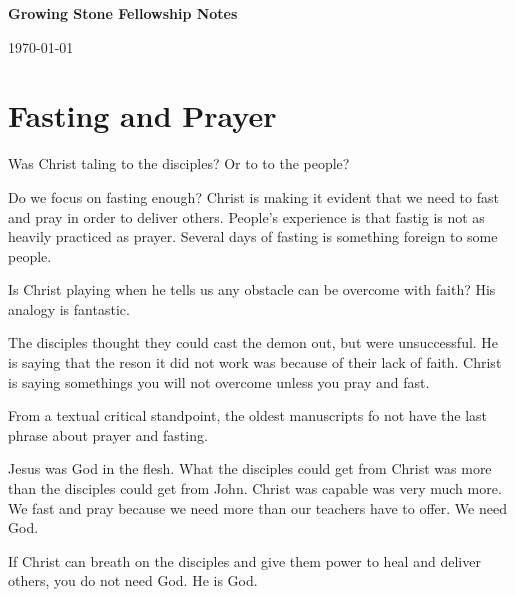 \documentclass[12pt]{article}
\begin{document}
	\textbf{Growing Stone Fellowship \hfill Notes}

	\hfill \today
	
	\section*{\normalsize Fasting and Prayer}

	\begin{quote}
		\BibleMatthewSeventeenSixteen{}
		\BibleMatthewSeventeenSeventeen{}
	\end{quote}
	
	Was Christ taling to the disciples? Or to to the people?

	\begin{quote}
		\BibleMatthewSeventeenNineteen{}
		\BibleMatthewSeventeenTwenty{}
		\BibleMatthewSeventeenTwentyOne{}
	\end{quote}

	Do we focus on fasting enough? Christ is making it evident that
	we need to fast and pray in order to deliver others. People's
	experience is that fastig is not as heavily practiced as prayer.
	Several days of fasting is something foreign to some people.

	Is Christ playing when he tells us any obstacle can be overcome
	with faith? His analogy is fantastic.

	The disciples thought they could cast the demon out, but were
	unsuccessful. He is saying that the reson it did not work was
	because of their lack of faith. Christ is saying somethings you
	will not overcome unless you pray and fast.

	From a textual critical standpoint, the oldest manuscripts
	fo not have the last phrase about prayer and fasting.

	\begin{quote}
		\BibleMarkTwoEighteen{}
		\BibleMarkTwoNineteen{}
	\end{quote}

	Jesus was God in the flesh. What the disciples could get from
	Christ was more than the disciples could get from John. Christ
	was capable was very much more. We fast and pray because we
	need more than our teachers have to offer. We need God.

	\begin{quote}
		\BibleJohnFourteenNine{}
	\end{quote}

	If Christ can breath on the disciples and give them power
	to heal and deliver others, you do not need God. He is God.
\end{document}
